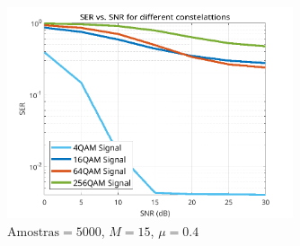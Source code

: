 \documentclass[a4paper,10pt]{article}
\begin{document}
\begin{enumerate}
				\begin{figure}[!ht]
					\centering
					\includegraphics[width=0.75\textwidth]{figs/L3Q6_D_ser.png}
					\caption{$\text{Amostras} = 5000$, $M = 15$, $\mu = 0.4$}
					\label{fig:L3Q6D}
				\end{figure}

		\end{enumerate}
	
\end{document}
